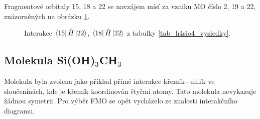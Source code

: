 \documentclass[
  digital, %
  table,   %
  lof,     %
  lot,     %
]{fithesis3}
\begin{document}
Fragmentové orbitaly  15, 18 a 22 se navzájem mísí za vzniku MO číslo 2, 19 a 22, znázorněných na obrázku \ref{obr_h4sio4_vysledky_III}.   
\begin{figure}
\begin{center}
\caption{Interakce $\bra{15}{\hat{H}}\ket{22}$, $\bra{18}{\hat{H}}\ket{22}$ z tabulky \ref{tab_h4sio4_vysledky}.}
\label{obr_h4sio4_vysledky_III}
\end{center}
\end{figure} 
\subsection{Molekula Si(OH)$_3$CH$_3$}
Molekula  byla zvolena jako příklad přímé interakce křemík$-$uhlík ve sloučeninách, kde je křemík koordinován čtyřmi atomy. Tato molekula nevykazuje žádnou symetrii. Pro výběr FMO se opět vycházelo ze znalosti interakčního diagramu. 
\end{document}
